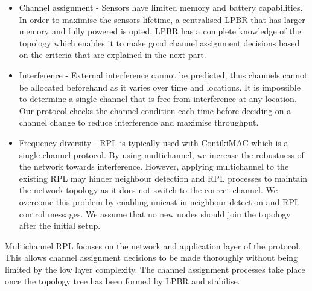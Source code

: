 \begin{itemize}
\item Channel assignment - Sensors have limited memory and battery capabilities. In order to maximise the sensors lifetime, a centralised LPBR that has larger memory and fully powered is opted. LPBR has a complete knowledge of the topology which enables it to make good channel assignment decisions based on the criteria that are explained in the next part. 

\item Interference - External interference cannot be predicted, thus channels cannot be allocated beforehand as it varies over time and locations. It is impossible to determine a single channel that is free from interference at any location. Our protocol checks the channel condition each time before deciding on a channel change to reduce interference and maximise throughput.

\item Frequency diversity - RPL is typically used with ContikiMAC which is a single channel protocol. By using multichannel, we increase the robustness of the network towards interference. However, applying multichannel to the existing RPL may hinder neighbour detection and RPL processes to maintain the network topology as it does not switch to the correct channel. We overcome this problem by enabling unicast in neighbour detection and RPL control messages. We assume that no new nodes should join the topology after the initial setup.
\end{itemize}

Multichannel RPL focuses on the network and application layer of the protocol. This allows channel assignment decisions to be made thoroughly without being limited by the low layer complexity. The channel assignment processes take place once the topology tree has been formed by LPBR and stabilise.

